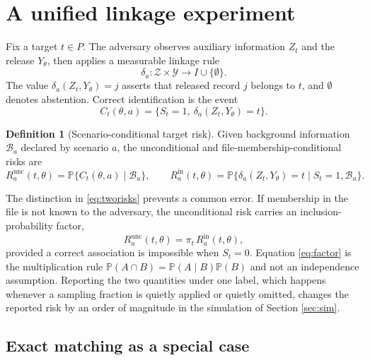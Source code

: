 \documentclass[11pt,a4paper]{article}
\theoremstyle{plain}
\theoremstyle{definition}
\newtheorem{definition}{Definition}
\newcommand{\Prob}{\mathbb{P}}
\begin{document}
\section{A unified linkage experiment}\label{sec:experiment}

Fix a target $t \in P$. The adversary observes auxiliary information $Z_t$ and
the release $Y_\theta$, then applies a measurable linkage rule
\begin{equation}
\delta_a : \mathcal{Z} \times \mathcal{Y} \longrightarrow I \cup \{\emptyset\} .
\label{eq:rule}
\end{equation}
The value $\delta_a(Z_t, Y_\theta) = j$ asserts that released record $j$
belongs to $t$, and $\emptyset$ denotes abstention. Correct identification is
the event
\begin{equation}
C_t(\theta, a) = \{S_t = 1, \ \delta_a(Z_t, Y_\theta) = t\} .
\end{equation}

\begin{definition}[Scenario-conditional target risk]\label{def:risk}
Given background information $\mathcal{B}_a$ declared by scenario $a$, the unconditional
and file-membership-conditional risks are
\begin{equation}
R_a^{\mathrm{unc}}(t, \theta) = \Prob\{C_t(\theta, a) \mid \mathcal{B}_a\}, \qquad
R_a^{\mathrm{in}}(t, \theta) = \Prob\{\delta_a(Z_t, Y_\theta) = t \mid S_t = 1,
\mathcal{B}_a\} .
\label{eq:tworisks}
\end{equation}
\end{definition}

The distinction in \eqref{eq:tworisks} prevents a common error. If membership
in the file is not known to the adversary, the unconditional risk carries an
inclusion-probability factor,
\begin{equation}
R_a^{\mathrm{unc}}(t, \theta) = \pi_t \, R_a^{\mathrm{in}}(t, \theta) ,
\label{eq:factor}
\end{equation}
provided a correct association is impossible when $S_t = 0$. Equation
\eqref{eq:factor} is the multiplication rule $\Prob(A \cap B) = \Prob(A \mid
B)\Prob(B)$ and not an independence assumption. Reporting the two quantities
under one label, which happens whenever a sampling fraction is quietly applied
or quietly omitted, changes the reported risk by an order of magnitude in the
simulation of Section \ref{sec:sim}.

\subsection{Exact matching as a special case}
\end{document}

